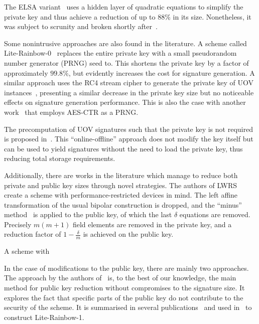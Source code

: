 \documentclass[draft, 12pt, a4paper, oneside]{memoir}
\begin{document}
The ELSA variant~\cite{} uses a hidden layer of quadratic equations to simplify the private key and thus achieve a reduction of up to $88\%$ in its size. Nonetheless, it was subject to scrunity and broken shortly after~\cite{}.

Some nonintrusive approaches are also found in the literature. A scheme called Lite-Rainbow-0~\cite{} replaces the entire private key with a small pseudorandom number generator (PRNG) seed to. This shortens the private key by a factor of approximately $99.8\%$, but evidently increases the cost for signature generation. A similar approach uses the RC4 stream cipher to generate the private key of UOV instances~\cite{}, presenting a similar decrease in the private key size but no noticeable effects on signature generation performance. This is also the case with another work~\cite{} that employs AES-CTR as a PRNG.

The precomputation of UOV signatures such that the private key is not required is proposed in~\cite{}. This ``online-offline'' approach does not modify the key itself but can be used to yield signatures without the need to load the private key, thus reducing total storage requirements.


Additionally, there are works in the literature which manage to reduce both private and public key sizes through novel strategies. The authors of LWRS~\cite{} create a scheme with performance-restricted devices in mind. The left affine transformation of the usual bipolar construction is dropped, and the ``minus'' method~\cite[Subsection 3.2.1]{} is applied to the public key, of which the last $\delta$ equations are removed. Precisely $m (m + 1)$ field elements are removed in the private key, and a reduction factor of $1 - \frac{\delta}{m}$ is achieved on the public key.

A scheme with

In the case of modifications to the public key, there are mainly two approaches.
The approach by the authors of~\cite{Petzoldt:201006:inproc} is, to the best of 
our knowledge, the main method for public key reduction without compromises to
the signature size. It explores the fact that specific parts of the public key
do not contribute to the security of the scheme. It is summarised in several
publications~\cite{Petzoldt:201012:inproc,Petzoldt:201103:inproc,Petzoldt:201211:inproc,Petzoldt:201307:phd}
and used in~\cite{Shim:201512:inproc} to construct Lite-Rainbow-1.
\end{document}
